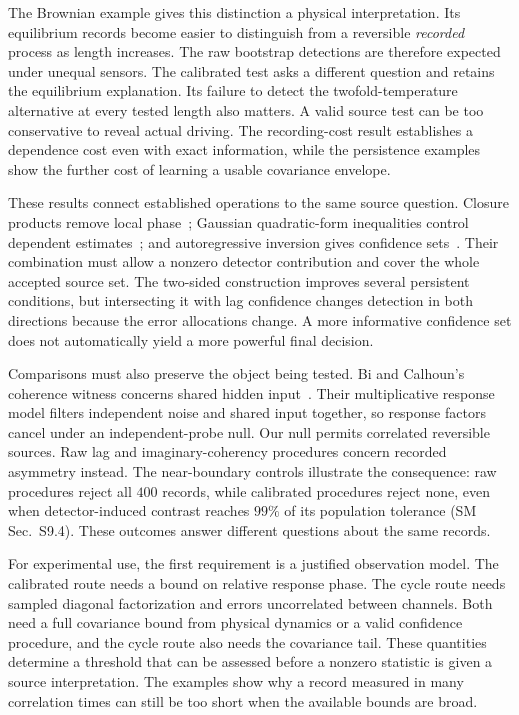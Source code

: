\documentclass[aps,pre,reprint,floatfix,superscriptaddress,nofootinbib]{revtex4-2}
\begin{document}
The Brownian example gives this distinction a physical interpretation. Its equilibrium records become easier to distinguish from a reversible \emph{recorded} process as length increases. The raw bootstrap detections are therefore expected under unequal sensors. The calibrated test asks a different question and retains the equilibrium explanation. Its failure to detect the twofold-temperature alternative at every tested length also matters. A valid source test can be too conservative to reveal actual driving. The recording-cost result establishes a dependence cost even with exact information, while the persistence examples show the further cost of learning a usable covariance envelope.

These results connect established operations to the same source question. Closure products remove local phase~\cite{thyagarajan2022}; Gaussian quadratic-form inequalities control dependent estimates~\cite{laurentmassart,hsukakadezhang,basumichailidis}; and autoregressive inversion gives confidence sets~\cite{dufour1990,dufourking1991,andrews1993}. Their combination must allow a nonzero detector contribution and cover the whole accepted source set. The two-sided construction improves several persistent conditions, but intersecting it with lag confidence changes detection in both directions because the error allocations change. A more informative confidence set does not automatically yield a more powerful final decision.

Comparisons must also preserve the object being tested. Bi and Calhoun's coherence witness concerns shared hidden input~\cite{bicalhoun2026}. Their multiplicative response model filters independent noise and shared input together, so response factors cancel under an independent-probe null. Our null permits correlated reversible sources. Raw lag and imaginary-coherency procedures concern recorded asymmetry instead. The near-boundary controls illustrate the consequence: raw procedures reject all $400$ records, while calibrated procedures reject none, even when detector-induced contrast reaches $99\%$ of its population tolerance (SM Sec.~S9.4). These outcomes answer different questions about the same records.

For experimental use, the first requirement is a justified observation model. The calibrated route needs a bound on relative response phase. The cycle route needs sampled diagonal factorization and errors uncorrelated between channels. Both need a full covariance bound from physical dynamics or a valid confidence procedure, and the cycle route also needs the covariance tail. These quantities determine a threshold that can be assessed before a nonzero statistic is given a source interpretation. The examples show why a record measured in many correlation times can still be too short when the available bounds are broad.
\end{document}
